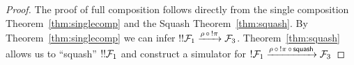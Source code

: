 \begin{proof}
The proof of full composition follows directly from the single composition Theorem~\ref{thm:singlecomp} and the Squash Theorem~\ref{thm:squash}.
By Theorem~\ref{thm:singlecomp} we can infer $!!\mathcal{F}_1 \xrightarrow{\rho \, \circ \, !\pi} \mathcal{F}_3$.
Theorem~\ref{thm:squash} allows us to ``squash'' $!!\mathcal{F}_1$ and construct a simulator for $!\mathcal{F}_1 \xrightarrow{\rho \, \circ \, !\pi \, \circ \, {\mathsf {squash}}} \mathcal{F}_3$
\end{proof}
